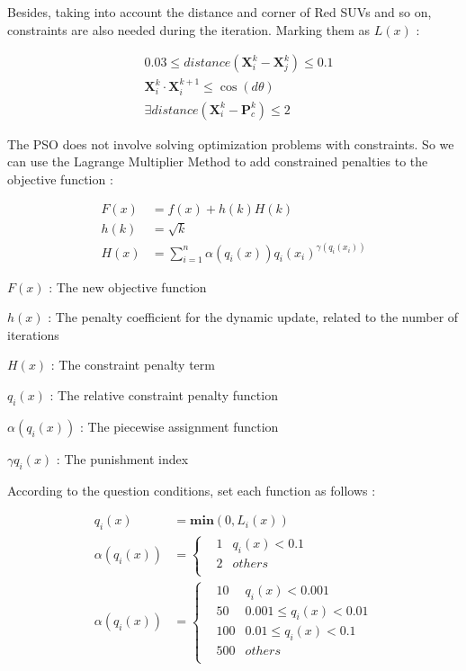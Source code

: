 \documentclass{mcmthesis}
\begin{document}
	Besides, taking into account the distance and corner of Red SUVs and so on, constraints are also needed during the iteration. Marking them as $L(x)$ :

\begin{align}
& 0.03 \leqslant distance(\mathbf{X}_i^k - \mathbf{X}_j^k)\leqslant 0.1 \\
& \mathbf{X}_i^k \cdot \mathbf{X}_i^{k+1} \leqslant \cos (d\theta) \\
& \exists distance(\mathbf{X}_i^k - \mathbf{P}_c^k) \leqslant 2
\end{align}

	The PSO does not involve solving optimization problems with constraints. So we can use the Lagrange Multiplier Method to add constrained penalties to the objective function :

\begin{align}
F(x) &= f(x) + h(k)H(k) \\
h(k) &= \sqrt{k} \\
H(x) &= \sum_{i=1}^n \alpha (q_i(x))q_i(x_i)^{\gamma (q_i(x_i))}
\end{align}

	$F(x)$ : The new objective function \par
	$h(x)$ : The penalty coefficient for the dynamic update, related to the number of iterations \par
	$H(x)$ : The constraint penalty term \par
	$q_i(x)$ : The relative constraint penalty function \par
	$\alpha (q_i(x))$ : The piecewise assignment function \par
	$\gamma q_i(x)$ : The punishment index \par
	According to the question conditions, set each function as follows :

\begin{align}
q_i(x) &= \mathbf{min}(0, L_i(x)) \\
\alpha(q_i(x)) &=\left\{
\begin{array}{rcl}
& 1       &q_i(x)<0.1 \\
& 2       &others \\
\end{array} \right. \\
\alpha(q_i(x)) &=\left\{
\begin{array}{rcl}
& 10       &q_i(x)<0.001 \\
& 50       &0.001\leqslant q_i(x) < 0.01 \\
& 100      &0.01\leqslant q_i(x) < 0.1 \\
& 500      &others \\
\end{array} \right. 
\end{align}
\end{document}
